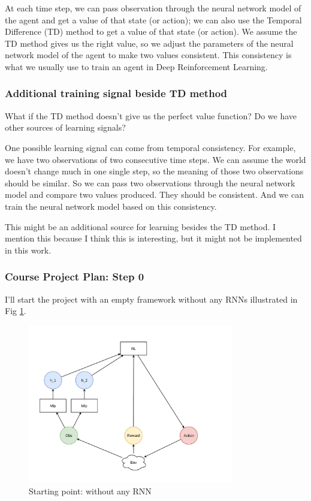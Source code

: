 At each time step, we can pass observation through the neural network model of the agent and get a value of that state (or action);
we can also use the Temporal Difference (TD) method to get a value of that state (or action).
We assume the TD method gives us the right value, so we adjust the parameters of the neural network model of the agent to make two values consistent.
This consistency is what we usually use to train an agent in Deep Reinforcement Learning.

\subsubsection{Additional training signal beside TD method}
What if the TD method doesn't give us the perfect value function? Do we have other sources of learning signals?

One possible learning signal can come from temporal consistency.
For example, we have two observations of two consecutive time steps.
We can assume the world doesn't change much in one single step, so the meaning of those two observations should be similar.
So we can pass two observations through the neural network model and compare two values produced.
They should be consistent.
And we can train the neural network model based on this consistency.

This might be an additional source for learning besides the TD method. 
I mention this because I think this is interesting, but it might not be implemented in this work.

\subsubsection{Course Project Plan: Step 0}

I'll start the project with an empty framework without any RNNs illustrated in Fig \ref{fig:starting_point}.

\begin{figure}[h]
    \centering
    \includegraphics[width=0.8\textwidth]{images/step-0.pdf}
    \caption{Starting point: without any RNN}
    \label{fig:starting_point}
\end{figure}

